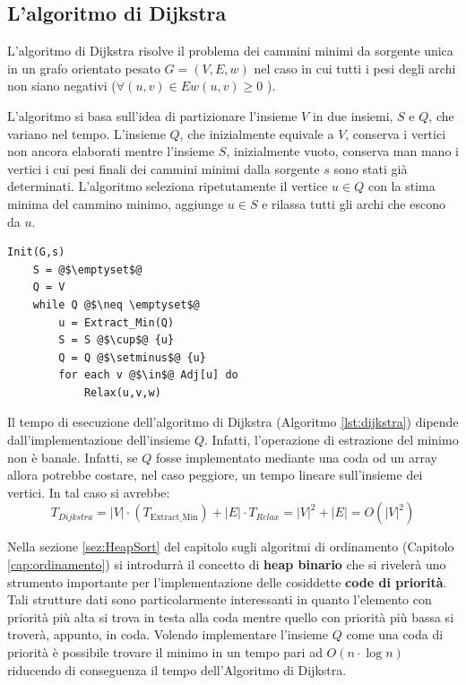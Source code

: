 \subsection{L'algoritmo di Dijkstra}
L'algoritmo di Dijkstra risolve il problema dei cammini minimi da sorgente unica in un grafo orientato pesato $G=(V,E,w)$ nel caso in cui tutti i pesi degli archi non siano negativi ($\forall (u,v) \in E w(u,v)\geq 0$ ).

L'algoritmo si basa sull'idea di partizionare l'insieme $V$ in due insiemi, $S$ e $Q$, che variano nel tempo. L'insieme $Q$, che inizialmente equivale a $V$, conserva i vertici non ancora elaborati mentre l'insieme $S$, inizialmente vuoto, conserva man mano i vertici i cui pesi finali dei cammini minimi dalla sorgente $s$ sono stati già determinati. L'algoritmo seleziona ripetutamente il vertice $u \in Q$ con la stima minima del cammino minimo, aggiunge $u \in S$ e rilassa tutti gli archi che escono da $u$.
\begin{lstlisting}[caption={\textsc{Dijkstra}(G,w,s)},language=asd,label=lst:dijkstra]
	Init(G,s)
	S = @$\emptyset$@
	Q = V
	while Q @$\neq \emptyset$@
		u = Extract_Min(Q)
		S = S @$\cup$@ {u}
		Q = Q @$\setminus$@ {u}
		for each v @$\in$@ Adj[u] do
			Relax(u,v,w)
\end{lstlisting}

Il tempo di esecuzione dell'algoritmo di Dijkstra (Algoritmo \ref{lst:dijkstra}) dipende dall'implementazione dell'insieme $Q$. Infatti, l'operazione di estrazione del minimo non è banale. Infatti, se $Q$ fosse implementato mediante una coda od un array allora potrebbe costare, nel caso peggiore, un tempo lineare sull'insieme dei vertici. In tal caso si avrebbe:
\begin{displaymath}
	T_{Dijkstra} = |V| \cdot (T_{\text{Extract\_Min}}) + |E| \cdot T_{Relax} = |V|^{2} + |E| = O(|V|^{2})
\end{displaymath}

Nella sezione \ref{sez:HeapSort} del capitolo sugli algoritmi di ordinamento (Capitolo \ref{cap:ordinamento}) si introdurrà il concetto di \textbf{heap binario} che si rivelerà uno strumento importante per l'implementazione delle cosiddette \textbf{code di priorità}. Tali strutture dati sono particolarmente interessanti in quanto l'elemento con priorità più alta si trova in testa alla coda mentre quello con priorità più bassa si troverà, appunto, in coda. Volendo implementare l'insieme $Q$ come una coda di priorità è possibile trovare il minimo in un tempo pari ad $O(n \cdot \log n)$ riducendo di conseguenza il tempo dell'Algoritmo di Dijkstra.

